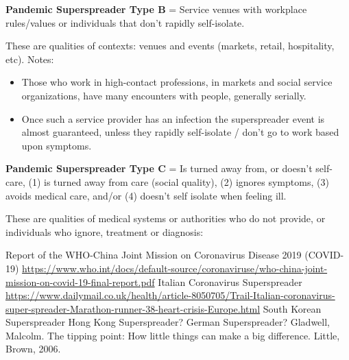 \documentclass[onecolumn,journal]{IEEEtran}
\begin{document}
\begin{multicols}{2}
\textbf{Pandemic Superspreader Type B} = Service venues with workplace rules/values or individuals that don't rapidly self-isolate.

These are qualities of contexts: venues and events (markets, retail, hospitality, etc). Notes:
\begin{itemize}
		\item Those who work in high-contact professions, in markets and social service organizations, have many encounters with people, generally serially.
		\item Once such a service provider has an infection the superspreader event is almost guaranteed, unless they rapidly self-isolate / don't go to work based upon symptoms. 
\end{itemize}

\textbf{Pandemic Superspreader Type C} = Is turned away from, or doesn't self-care, (1) is turned away from care (social quality), (2) ignores symptoms, (3) avoids medical care, and/or (4) doesn't self isolate when feeling ill.

These are qualities of medical systems or authorities who do not provide, or individuals who ignore, treatment or diagnosis: 

\end{multicols}

\begin{thebibliography}{20}


 Report of the WHO-China Joint Mission on Coronavirus Disease 2019 (COVID-19) \url{https://www.who.int/docs/default-source/coronaviruse/who-china-joint-mission-on-covid-19-final-report.pdf} 
 Italian Coronavirus Superspreader \url{https://www.dailymail.co.uk/health/article-8050705/Trail-Italian-coronavirus-super-spreader-Marathon-runner-38-heart-crisis-Europe.html}
 South Korean Superspreader \url{}
 Hong Kong Superspreader? \url{}
 German Superspreader? \url{}
 Gladwell, Malcolm. The tipping point: How little things can make a big difference. Little, Brown, 2006.
\end{thebibliography}

		

	
% 

\end{document}

